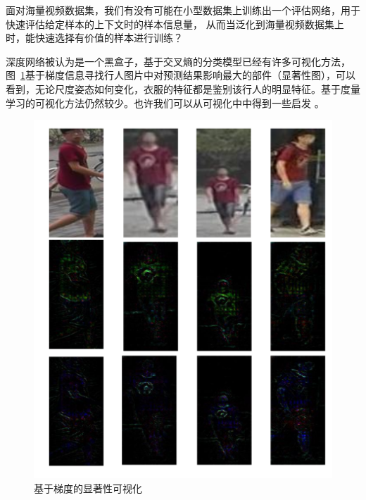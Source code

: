 面对海量视频数据集，我们有没有可能在小型数据集上训练出一个评估网络，用于快速评估给定样本的上下文时的样本信息量，
从而当泛化到海量视频数据集上时，能快速选择有价值的样本进行训练？%


深度网络被认为是一个黑盒子，基于交叉熵的分类模型已经有许多可视化方法，图~\ref{fig:grad}基于梯度信息寻找行人图片中对预测结果影响最大的部件（显著性图），可以看到，无论尺度姿态如何变化，衣服的特征都是鉴别该行人的明显特征。基于度量学习的可视化方法仍然较少。也许我们可以从可视化中中得到一些启发 。


\begin{figure}
	\centering
	\includegraphics[width=.7\textwidth]{fig/2018-05-21-09-58-23.png}
	\caption{基于梯度的显著性可视化}\label{fig:grad}
\end{figure}


\printbibliography[heading=chapbib]
